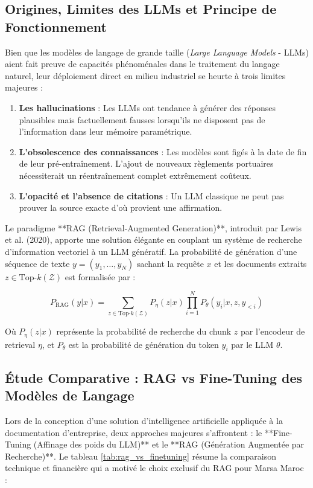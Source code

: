 \documentclass[12pt,a4paper,oneside]{report}
\begin{document}
\subsection{Origines, Limites des LLMs et Principe de Fonctionnement}
Bien que les modèles de langage de grande taille (\textit{Large Language Models} - LLMs) aient fait preuve de capacités phénoménales dans le traitement du langage naturel, leur déploiement direct en milieu industriel se heurte à trois limites majeures :
\begin{enumerate}
    \item \textbf{Les hallucinations} : Les LLMs ont tendance à générer des réponses plausibles mais factuellement fausses lorsqu'ils ne disposent pas de l'information dans leur mémoire paramétrique.
    \item \textbf{L'obsolescence des connaissances} : Les modèles sont figés à la date de fin de leur pré-entraînement. L'ajout de nouveaux règlements portuaires nécessiterait un réentraînement complet extrêmement coûteux.
    \item \textbf{L'opacité et l'absence de citations} : Un LLM classique ne peut pas prouver la source exacte d'où provient une affirmation.
\end{enumerate}

Le paradigme **RAG (Retrieval-Augmented Generation)**, introduit par Lewis et al. (2020), apporte une solution élégante en couplant un système de recherche d'information vectoriel à un LLM génératif. La probabilité de génération d'une séquence de texte $y = (y_1, \dots, y_N)$ sachant la requête $x$ et les documents extraits $z \in \text{Top-}k(\mathcal{Z})$ est formalisée par :

\begin{equation}
P_{\text{RAG}}(y|x) = \sum_{z \in \text{Top-}k(\mathcal{Z})} P_{\eta}(z|x) \prod_{i=1}^N P_{\theta}(y_i | x, z, y_{<i})
\end{equation}

Où $P_{\eta}(z|x)$ représente la probabilité de recherche du chunk $z$ par l'encodeur de retrieval $\eta$, et $P_{\theta}$ est la probabilité de génération du token $y_i$ par le LLM $\theta$.


\subsection{Étude Comparative : RAG vs Fine-Tuning des Modèles de Langage}
Lors de la conception d'une solution d'intelligence artificielle appliquée à la documentation d'entreprise, deux approches majeures s'affrontent : le **Fine-Tuning (Affinage des poids du LLM)** et le **RAG (Génération Augmentée par Recherche)**. Le tableau \ref{tab:rag_vs_finetuning} résume la comparaison technique et financière qui a motivé le choix exclusif du RAG pour Marsa Maroc :
\end{document}
